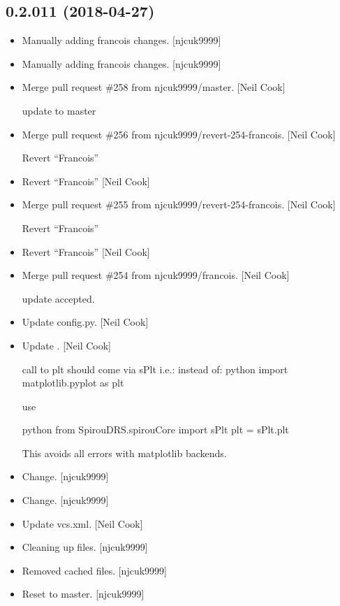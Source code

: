 \documentclass[a4paper,10pt,english]{report}
\begin{document}
\subsection{0.2.011 (2018-04-27)}
\label{\detokenize{misc/changelog:id452}}\begin{itemize}
\item {} 
Manually adding francois changes. {[}njcuk9999{]}

\item {} 
Manually adding francois changes. {[}njcuk9999{]}

\item {} 
Merge pull request \#258 from njcuk9999/master. {[}Neil Cook{]}

update to master

\item {} 
Merge pull request \#256 from njcuk9999/revert-254-francois. {[}Neil
Cook{]}

Revert “Francois”

\item {} 
Revert “Francois” {[}Neil Cook{]}

\item {} 
Merge pull request \#255 from njcuk9999/revert-254-francois. {[}Neil
Cook{]}

Revert “Francois”

\item {} 
Revert “Francois” {[}Neil Cook{]}

\item {} 
Merge pull request \#254 from njcuk9999/francois. {[}Neil Cook{]}

update accepted.

\item {} 
Update config.py. {[}Neil Cook{]}

\item {} 
Update . {[}Neil Cook{]}

call to plt should come via sPlt i.e.:
instead of:
python
import matplotlib.pyplot as plt

use

python
from SpirouDRS.spirouCore import sPlt
plt = sPlt.plt

This avoids all errors with matplotlib backends.

\item {} 
Change. {[}njcuk9999{]}

\item {} 
Change. {[}njcuk9999{]}

\item {} 
Update vcs.xml. {[}Neil Cook{]}

\item {} 
Cleaning up files. {[}njcuk9999{]}

\item {} 
Removed cached files. {[}njcuk9999{]}

\item {} 
Reset to master. {[}njcuk9999{]}

\end{itemize}
\end{document}
